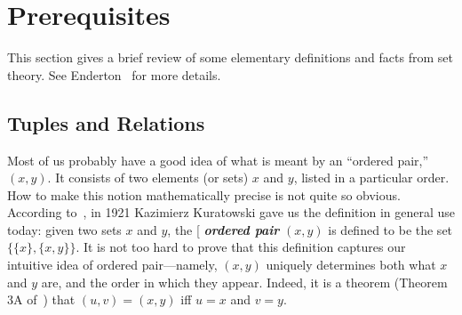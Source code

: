 \documentclass[12pt]{article}
\theoremstyle{plain}
\theoremstyle{definition}
\theoremstyle{remark}
\theoremstyle{remark}
\numberwithin{theorem}{section}
\numberwithin{equation}{section}
\newcommand{\<}{\ensuremath{\langle}}
\renewcommand{\>}{\ensuremath{\rangle}}
\newcommand{\bA}{\ensuremath{\mathbf{A}}}
\newcommand{\bF}{\ensuremath{\mathbf{F}}}
\newcommand{\indexit}[1]{\index{#1|textit}}
\def\defn#1{\gdef\defnstring{#1}%
  \xdef\dodefnii{{\noexpand\bfseries\noexpand\em
       \defnstring}\noexpand\indexit{\defnstring}\noexpand\makeatother}%
  \futurelet\nextthing\dodefn}
\def\dodefn{%
  \ifx\nextthing[\let\next=\dodefni
    \else\let\next=\dodefnii\fi
  \makeatletter
  \next}
\def\dodefni[#1]{%
  {\bfseries\em\defnstring}%
  \indexit{#1}%
  \makeatother}
\begin{document}




\section{Prerequisites}
This section gives a brief review of some elementary definitions and facts
from set theory.
See Enderton~\cite{Enderton:1977} for more details.
\subsection{Tuples and Relations}
\label{sec:relations}
Most of us probably have a good idea of what is meant by an
``ordered pair,'' $(x, y)$.  It consists of two elements (or sets) 
$x$ and $y$, listed in a particular order.  
How to make this notion mathematically precise is not quite
so obvious.  According to~\cite{Enderton:1977}, in 1921 Kazimierz
Kuratowski gave us the definition in general use today: given two
sets $x$ and $y$, the \defn{ordered pair} $(x, y)$ is defined to be the set
$\{\{x\}, \{x, y\}\}$. 
It is not too hard to prove that this definition captures our
intuitive idea of ordered pair---namely, $(x, y)$ uniquely determines both
what $x$ and $y$ are, and the order in which they appear.  Indeed, it is a
theorem (Theorem 3A of~\cite{Enderton:1977}) that $(u, v) = (x, y)$ iff $u =
x$ and $v = y$. 
\end{document}
